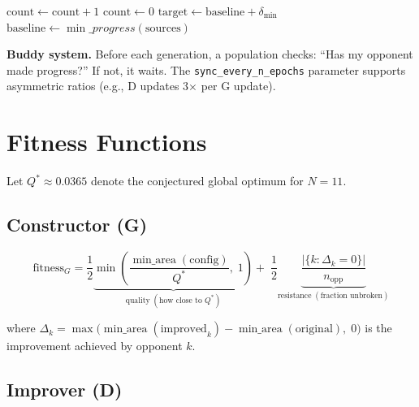 \documentclass[11pt,a4paper]{article}
\newcommand{\Qstar}{Q^{*}}      %
\newcommand{\minarea}{\operatorname{min\_area}}
\begin{document}
\begin{algorithm}[H]
\SetAlgoLined\DontPrintSemicolon
\caption{ProgressBasedSyncHook (pre-step hook)}
\label{alg:sync}
$\text{count} \leftarrow \text{count} + 1$\;
$\text{count} \leftarrow 0$\;
$\text{target} \leftarrow \text{baseline} + \delta_{\min}$\;
$\text{baseline} \leftarrow \min\_progress(\text{sources})$\;
\end{algorithm}

\begin{eli5box}
\textbf{Buddy system.}  Before each generation, a population checks: ``Has my opponent made progress?''  If not, it waits.  The \texttt{sync\_every\_n\_epochs} parameter supports asymmetric ratios (e.g., D updates 3$\times$ per G update).
\end{eli5box}

\section{Fitness Functions}

Let $\Qstar \approx 0.0365$ denote the conjectured global optimum for $N\!=\!11$.

\subsection{Constructor (G)}

\begin{equation}
  \text{fitness}_G = \frac{1}{2}\underbrace{\min\!\left(\frac{\minarea(\text{config})}{\Qstar},\; 1\right)}_{\text{quality}\;(\text{how close to }\Qstar)} + \;\frac{1}{2}\underbrace{\frac{|\{k : \Delta_k = 0\}|}{n_{\text{opp}}}}_{\text{resistance}\;(\text{fraction unbroken})}
  \label{eq:fitnessG}
\end{equation}

where $\Delta_k = \max\bigl(\minarea(\text{improved}_k) - \minarea(\text{original}),\; 0\bigr)$ is the improvement achieved by opponent $k$.

\subsection{Improver (D)}
\end{document}
